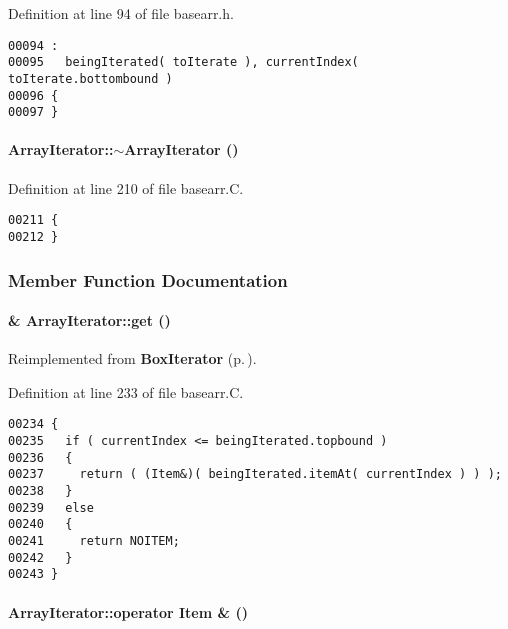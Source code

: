 Definition at line 94 of file basearr.h.\small\begin{verbatim}00094 :
00095   beingIterated( toIterate ), currentIndex( toIterate.bottombound )
00096 {
00097 }

\end{verbatim}\normalsize 
\label{ArrayIterator_a1}
\paragraph{\setlength{\rightskip}{0pt plus 5cm}Array\-Iterator::$\sim$Array\-Iterator ()\hspace{0.3cm}{\tt  [virtual]}}\hfill



Definition at line 210 of file basearr.C.\small\begin{verbatim}00211 {
00212 }
\end{verbatim}\normalsize 


\subsubsection{Member Function Documentation}
\label{ArrayIterator_a4}
\paragraph{ \& Array\-Iterator::get ()\hspace{0.3cm}{\tt  [virtual]}}\hfill



Reimplemented from {\bf Box\-Iterator} {\rm (p.\,\pageref{BoxIterator_a4})}.

Definition at line 233 of file basearr.C.\small\begin{verbatim}00234 {
00235   if ( currentIndex <= beingIterated.topbound )
00236   {
00237     return ( (Item&)( beingIterated.itemAt( currentIndex ) ) );
00238   }
00239   else
00240   {
00241     return NOITEM;
00242   }
00243 }
\end{verbatim}\normalsize 
\label{ArrayIterator_a3}
\paragraph{\setlength{\rightskip}{0pt plus 5cm}Array\-Iterator::operator {\bf Item} \& ()\hspace{0.3cm}{\tt  [virtual]}}\hfill



